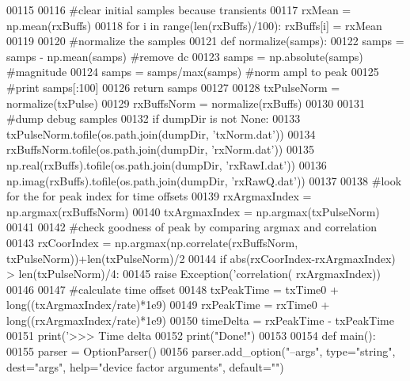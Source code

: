 \begin{DoxyCode}
{{{{{00115 
00116     \textcolor{comment}{#clear initial samples because transients}
00117     rxMean = np.mean(rxBuffs)
00118     \textcolor{keywordflow}{for} i \textcolor{keywordflow}{in} range(len(rxBuffs)/100): rxBuffs[i] = rxMean
00119 
00120     \textcolor{comment}{#normalize the samples}
00121     \textcolor{keyword}{def }normalize(samps):
00122         samps = samps - np.mean(samps) \textcolor{comment}{#remove dc}
00123         samps = np.absolute(samps) \textcolor{comment}{#magnitude}
00124         samps = samps/max(samps) \textcolor{comment}{#norm ampl to peak}
00125         \textcolor{comment}{#print samps[:100]}
00126         \textcolor{keywordflow}{return} samps
00127 
00128     txPulseNorm = normalize(txPulse)
00129     rxBuffsNorm = normalize(rxBuffs)
00130 
00131     \textcolor{comment}{#dump debug samples}
00132     \textcolor{keywordflow}{if} dumpDir \textcolor{keywordflow}{is} \textcolor{keywordflow}{not} \textcolor{keywordtype}{None}:
00133         txPulseNorm.tofile(os.path.join(dumpDir, \textcolor{stringliteral}{'txNorm.dat'}))
00134         rxBuffsNorm.tofile(os.path.join(dumpDir, \textcolor{stringliteral}{'rxNorm.dat'}))
00135         np.real(rxBuffs).tofile(os.path.join(dumpDir, \textcolor{stringliteral}{'rxRawI.dat'}))
00136         np.imag(rxBuffs).tofile(os.path.join(dumpDir, \textcolor{stringliteral}{'rxRawQ.dat'}))
00137 
00138     \textcolor{comment}{#look for the for peak index for time offsets}
00139     rxArgmaxIndex = np.argmax(rxBuffsNorm)
00140     txArgmaxIndex = np.argmax(txPulseNorm)
00141 
00142     \textcolor{comment}{#check goodness of peak by comparing argmax and correlation}
00143     rxCoorIndex = np.argmax(np.correlate(rxBuffsNorm, txPulseNorm))+len(txPulseNorm)/2
00144     \textcolor{keywordflow}{if} abs(rxCoorIndex-rxArgmaxIndex) > len(txPulseNorm)/4:
00145         \textcolor{keywordflow}{raise} Exception(\textcolor{stringliteral}{'correlation(%
      rxArgmaxIndex))
00146 
00147     \textcolor{comment}{#calculate time offset}
00148     txPeakTime = txTime0 + long((txArgmaxIndex/rate)*1e9)
00149     rxPeakTime = rxTime0 + long((rxArgmaxIndex/rate)*1e9)
00150     timeDelta = rxPeakTime - txPeakTime
00151     print(\textcolor{stringliteral}{'>>> Time delta %
00152     print(\textcolor{stringliteral}{"Done!"})
00153 
00154 \textcolor{keyword}{def }main():
00155     parser = OptionParser()
00156     parser.add\_option(\textcolor{stringliteral}{"--args"}, type=\textcolor{stringliteral}{"string"}, dest=\textcolor{stringliteral}{"args"}, help=\textcolor{stringliteral}{"device factor arguments"}, default=\textcolor{stringliteral}{""})
}}}}}}}
\end{DoxyCode}
